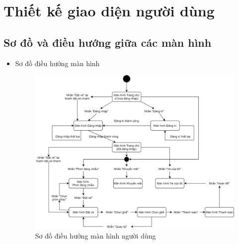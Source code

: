 \documentclass[a4paper, 12pt]{article}
\begin{document}
\section{Thiết kế giao diện người dùng}

\subsection{Sơ đồ và điều hướng giữa các màn hình}

\begin{itemize}
	\item Sơ đồ điều hướng màn hình
		\begin{figure}[H]
			\begin{center}
				\includegraphics[scale = 0.3]{Diagram/User Screen-flow diagram.png}
				\caption{Sơ đồ điều hướng màn hình người dùng}
			\end{center}
		\end{figure}

	\clearpage


\end{itemize}
\end{document}
